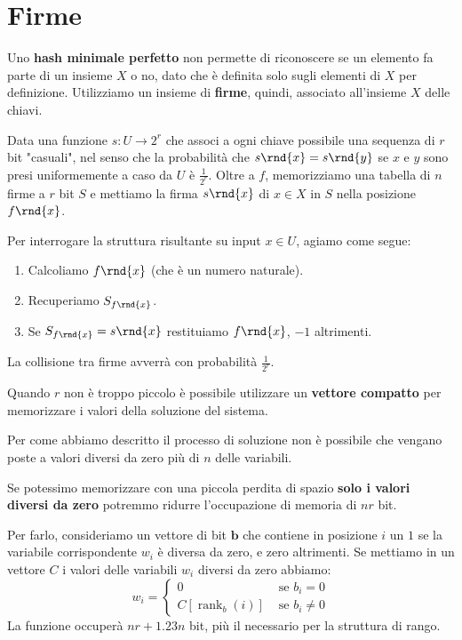 \documentclass[\main/main.tex]{subfiles}
\begin{document}
\section{Firme}
\begin{observation}
    Uno \textbf{hash minimale perfetto} non permette di riconoscere se un elemento fa parte di un insieme \(X\) o no, dato che è definita solo sugli elementi di \(X\) per definizione. Utilizziamo un insieme di \textbf{firme}, quindi, associato all'insieme \(X\) delle chiavi.
\end{observation}
\begin{observation}
    Data una funzione \(s:U\rightarrow 2^r\) che associ a ogni chiave possibile una sequenza di \(r\) bit "casuali", nel senso che la probabilità che \(s\rnd{x} = s\rnd{y}\) se \(x\) e \(y\) sono presi uniformemente a caso da \(U\) è \(\frac{1}{2^r}\). Oltre a \(f\), memorizziamo una tabella di \(n\) firme a \(r\) bit \(S\) e mettiamo la firma \(s\rnd{x}\) di \(x \in X\) in \(S\) nella posizione \(f\rnd{x}\).
    
    Per interrogare la struttura risultante su input \(x \in U\), agiamo come segue:
    \begin{enumerate}
        \item Calcoliamo \(f\rnd{x}\) (che è un numero naturale).
        \item Recuperiamo \(S_{f\rnd{x}}\).
        \item Se \(S_{f\rnd{x}} = s\rnd{x}\) restituiamo \(f\rnd{x}\), \(-1\) altrimenti.
    \end{enumerate}
    
    La collisione tra firme avverrà con probabilità \(\frac{1}{2^r}\).
\end{observation}
\begin{observation}
    Quando \(r\) non è troppo piccolo è possibile utilizzare un \textbf{vettore compatto} per memorizzare i valori della soluzione del sistema. 
    
    Per come abbiamo descritto il processo di soluzione non è possibile che vengano poste a valori diversi da zero più di \(n\) delle variabili.
    
    Se potessimo memorizzare con una piccola perdita di spazio \textbf{solo i valori diversi da zero} potremmo ridurre l'occupazione di memoria di \(nr\) bit.
    
    Per farlo, consideriamo un vettore di bit \(\bm{b}\) che contiene in posizione \(i\) un \(1\) se la variabile corrispondente \(w_i\) è diversa da zero, e zero altrimenti. Se mettiamo in un vettore \(C\) i valori delle variabili \(w_i\) diversi da zero abbiamo:
    \[
        w_{i}=\left\{\begin{array}{ll}{0} & {\text { se } b_{i}=0} \\ {C\left[\operatorname{rank}_{b}(i)\right]} & {\text { se } b_{i} \neq 0}\end{array}\right.
    \]
    La funzione occuperà \(nr + 1.23n\) bit, più il necessario per la struttura di rango.
\end{observation}
\end{document}
